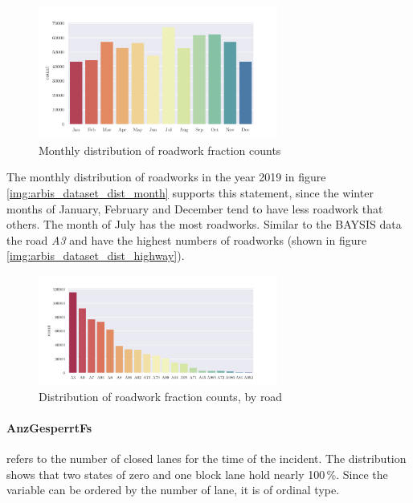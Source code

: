 \begin{figure}[ht]
	\centering
	\includegraphics[width=0.7\textwidth]{../CorrAnalysis/data/ArbIS/01_dataset/plots/arbis_dataset_hist_month}
	\caption{Monthly distribution of roadwork fraction counts}
	\label{img:arbis_dataset_dist_month}
\end{figure}

The monthly distribution of roadworks in the year 2019 in figure \autoref{img:arbis_dataset_dist_month} supports this statement, since the winter months of January, February and December tend to have less roadwork that others. The month of July has the most roadworks. Similar to the BAYSIS data the road \textit{A3} and  have the highest numbers of roadworks (shown in figure \autoref{img:arbis_dataset_dist_highway}).

\begin{figure}[ht]
	\centering
	\includegraphics[width=0.7\textwidth]{../CorrAnalysis/data/ArbIS/01_dataset/plots/arbis_dataset_hist_highway}
	\caption{Distribution of roadwork fraction counts, by road}
	\label{img:arbis_dataset_dist_highway}
\end{figure}

\pagebreak

\paragraph{AnzGesperrtFs} refers to the number of closed lanes for the time of the incident. The distribution shows that two states of zero and one block lane hold nearly 100\,\%. Since the variable can be ordered by the number of lane, it is of ordinal type.

